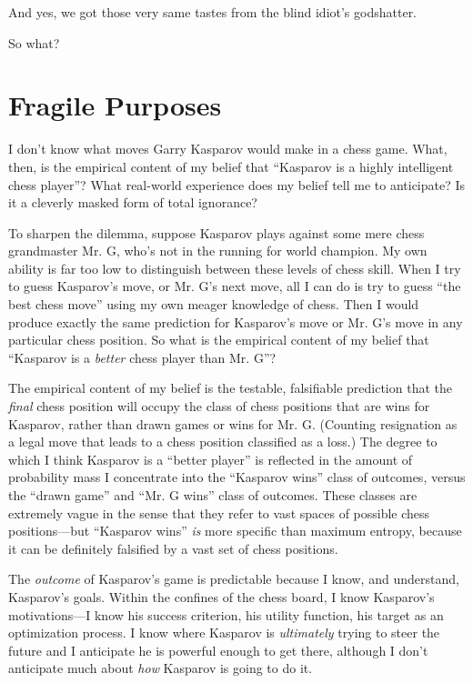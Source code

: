 {
 And yes, we got those very same tastes from the blind
idiot's godshatter.}

{
 So what?}

\myendsectiontext

\chapter{Fragile Purposes}


{
 I don't know what moves Garry Kasparov would make
in a chess game. What, then, is the empirical content of my belief that
``Kasparov is a highly intelligent chess
player''? What real-world experience does my belief
tell me to anticipate? Is it a cleverly masked form of total ignorance?
}

{
 To sharpen the dilemma, suppose Kasparov plays against some mere
chess grandmaster Mr. G, who's not in the running for
world champion. My own ability is far too low to distinguish between
these levels of chess skill. When I try to guess
Kasparov's move, or Mr. G's next move,
all I can do is try to guess ``the best chess
move'' using my own meager knowledge of chess. Then I
would produce exactly the same prediction for
Kasparov's move or Mr. G's move in any
particular chess position. So what is the empirical content of my
belief that ``Kasparov is a \textit{better} chess
player than Mr. G''?}

{
 The empirical content of my belief is the testable, falsifiable
prediction that the \textit{final} chess position will occupy the class
of chess positions that are wins for Kasparov, rather than drawn games
or wins for Mr. G. (Counting resignation as a legal move that leads to
a chess position classified as a loss.) The degree to which I think
Kasparov is a ``better player'' is
reflected in the amount of probability mass I concentrate into the
``Kasparov wins'' class of outcomes,
versus the ``drawn game'' and
``Mr. G wins'' class of outcomes.
These classes are extremely vague in the sense that they refer to vast
spaces of possible chess positions---but ``Kasparov
wins'' \textit{is} more specific than maximum
entropy, because it can be definitely falsified by a vast set of chess
positions.}

{
 The \textit{outcome} of Kasparov's game is
predictable because I know, and understand, Kasparov's
goals. Within the confines of the chess board, I know
Kasparov's motivations---I know his success criterion,
his utility function, his target as an optimization process. I know
where Kasparov is \textit{ultimately} trying to steer the future and I
anticipate he is powerful enough to get there, although I
don't anticipate much about \textit{how} Kasparov is
going to do it.}

